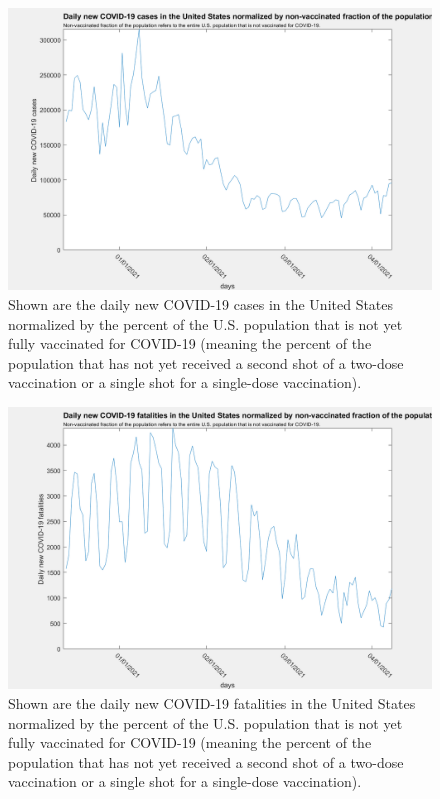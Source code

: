 \documentclass[twoside]{article}
\begin{document}
\begin{multicols}{2}
\begin{figure}[H]
	\includegraphics[width=\linewidth]{images/usa_normalized_cases_vf.png}
	\caption{Shown are the daily new COVID-19 cases in the United States normalized by the percent of the U.S. population that is not yet fully vaccinated for COVID-19 (meaning the percent of the population that has not yet received a second shot of a two-dose vaccination or a single shot for a single-dose vaccination).}
	\label{fig:images/usa_normalized_cases_vfLabel}
\end{figure}

\begin{figure}[H]
	\includegraphics[width=\linewidth]{images/usa_normalized_fatalities_vf.png}
	\caption{Shown are the daily new COVID-19 fatalities in the United States normalized by the percent of the U.S. population that is not yet fully vaccinated for COVID-19 (meaning the percent of the population that has not yet received a second shot of a two-dose vaccination or a single shot for a single-dose vaccination).}
	\label{fig:images/usa_normalized_fatalities_vfLabel}
\end{figure}



\end{multicols}
\end{document}
